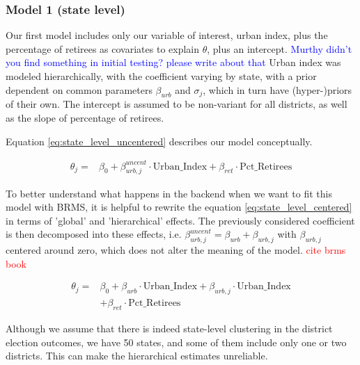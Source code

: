 \documentclass[12pt]{article}
\newcommand{\blue}[1]{\textcolor{blue}{#1}}
\begin{document}
\subsubsection*{Model 1 (state level)}


Our first model includes only our variable of interest, urban index, plus the percentage of retirees as covariates to explain $\theta$, plus an intercept.
\blue{ Murthy didn't you find something in initial testing? please write about that}
Urban index was modeled hierarchically, with the coefficient varying by state, with a prior dependent on common parameters $\beta_{urb}$ and $\sigma_{j}$, which in turn have (hyper-)priors of their own. The intercept is assumed to be non-variant for all districts, as well as the slope of percentage of retirees.

Equation \ref{eq:state_level_uncentered} describes our model conceptually.


\begin{equation} \label{eq:state_level_uncentered}
	\begin{aligned}
		\theta_{j} =    &\beta_0 + \beta_{urb,j}^{uncent} \cdot \text{Urban\_Index} + \beta_{ret} \cdot \text{Pct\_Retirees}
	\end{aligned}
\end{equation}

To better understand what happens in the backend when we want to fit this model with BRMS, it is helpful to rewrite the equation \ref{eq:state_level_centered} in terms of 'global' and 'hierarchical' effects. The previously considered coefficient is then decomposed into these effects, i.e.
$\beta_{urb,j}^{uncent} = \beta_{urb} + \beta_{urb,j}$
with $\beta_{urb,j}$ centered around zero, which does not alter the meaning of the model. \textcolor{red}{cite brms book}

\begin{equation} \label{eq:state_level_centered}
	\begin{aligned}
		\theta_{j} =    &\beta_0 + \beta_{urb} \cdot \text{Urban\_Index} + \beta_{urb,j} \cdot \text{Urban\_Index} \\
		&+ \beta_{ret} \cdot \text{Pct\_Retirees}
	\end{aligned}
\end{equation}


Although we assume that there is indeed state-level clustering in the district election outcomes, we have 50 states, and some of them include only one or two districts. This can make the hierarchical estimates unreliable. 
\end{document}
